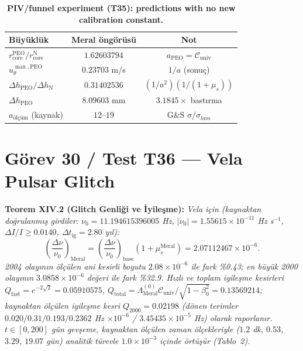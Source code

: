 \documentclass[12pt,a4paper]{article}
\begin{document}
\begin{table}[!htbp]
\centering\footnotesize
\setlength{\tabcolsep}{3pt}
\caption{\textbf{PIV/funnel experiment (T35): predictions with no new calibration constant.}}
\label{tab:piv}
\vspace{0.1cm}
\begin{tabular}{@{}l|c|c@{}}
\toprule
Büyüklük & Meral öngörüsü & Not \\
\midrule
$r_{\mathrm{core}}^{\mathrm{PEO}}/r_{\mathrm{core}}^{\mathrm{N}}$ & $1.62603794$ & $a_{\mathrm{PEO}}=\mathcal{C}_{\mathrm{univ}}$ \\
$u_\theta^{\max,\mathrm{PEO}}$ & $0.23703$ m/s & $1/a$ (sonuç) \\
$\Delta h_{\mathrm{PEO}}/\Delta h_{\mathrm{N}}$ & $0.31402536$ & $(1/a^2)(1/(1+\mu_s))$ \\
$\Delta h_{\mathrm{PEO}}$ & $8.09603$ mm & $3.1845\times$ bastırma \\
$a_{\mathrm{ölçüm}}$ (kaynak) & $12$--$19$ & G\&S $\sigma/\sigma_{lam}$ \\
\bottomrule
\end{tabular}
\end{table}

\section{Görev 30 / Test T36 --- Vela Pulsar Glitch}

\textbf{Teorem XIV.2 (Glitch Genliği ve İyileşme):} \textit{Vela için
(kaynaktan doğrulanmış girdiler: $\nu_0=11.194615396005$ Hz,
$|\dot\nu_0|=1.55615\times 10^{-11}$ Hz s$^{-1}$,
$\Delta I/I \ge 0.0140$, $\Delta t_{\mathrm{ig}}=2.80$ yıl):}
\begin{equation}
\boxed{\left(\frac{\Delta\nu}{\nu_0}\right)_{\mathrm{Meral}}
=\left(\frac{\Delta\nu}{\nu_0}\right)_{\mathrm{base}}
(1+\mu_s^{\mathrm{Meral}})=2.07112467\times 10^{-6}.}
\end{equation}
\textit{2004 olayının ölçülen ani kesirli boyutu $2.08\times 10^{-6}$
ile fark \%0.43; en büyük 2000 olayının $3.0858\times 10^{-6}$ değeri
ile fark \%32.9. Hızlı ve toplam iyileşme kesirleri
$Q_{\mathrm{fast}}=e^{-2\sqrt{2}}=0.05910575$,
$Q_{\mathrm{total}}=\Lambda_{\mathrm{Meral}}^{(0)}\mathcal{C}_{\mathrm{univ}}/
\sqrt{1-\beta_0^2}=0.13569214$; kaynaktan ölçülen iyileşme kesri
$Q_{2000}=0.02198$ (dönen terimler $0.020/0.31/0.193/0.2362$ Hz
$\times 10^{-6}$ / $3.45435\times 10^{-5}$ Hz) olarak raporlanır.
$t\in[0,200]$ gün gevşeme, kaynaktan ölçülen zaman ölçekleriyle
($1.2$ dk, $0.53$, $3.29$, $19.07$ gün) analitik türevle $1.0\times 10^{-3}$
içinde örtüşür (Tablo~2).}
\end{document}
